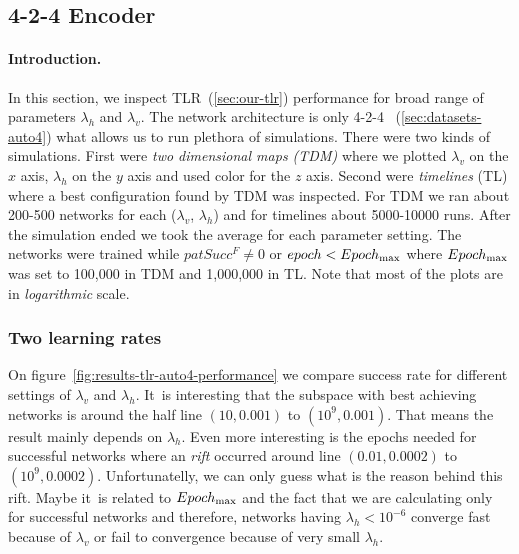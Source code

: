 

\subsection{4-2-4 Encoder} 
\label{sec:results-auto4} 

\paragraph{Introduction.} 
In this section, we inspect TLR~(\ref{sec:our-tlr}) performance for broad range of parameters $\lambda_h$ and $\lambda_v$. The network architecture is only 4-2-4~
(\ref{sec:datasets-auto4}) what allows us to run plethora of simulations. There were two kinds of simulations. First were \emph{two dimensional maps (TDM)} where we plotted $\lambda_v$ on the $x$ axis, $\lambda_h$ on the $y$ axis and used color for the $z$ axis. Second were \emph{timelines} (TL) where a best configuration found by TDM was inspected. For TDM we ran about 200-500 networks for each ($\lambda_v$, $\lambda_h$) and for timelines about 5000-10000 runs. After the simulation ended we took the average for each parameter setting. The networks were trained while $patSucc^F \neq 0$ or $epoch < Epoch_{\rm max}$ where $Epoch_{\rm max}$ was set to 100,000 in TDM and 1,000,000 in TL. Note that most of the plots are in \emph{logarithmic} scale. 

 

\subsubsection{Two learning rates} 
\label{sec:tlr-auto4}

On figure~\ref{fig:results-tlr-auto4-performance} we compare success rate for different settings of $\lambda_v$ and $\lambda_h$. It~is interesting that the subspace with best achieving networks is around the half line $(10, 0.001)$ to $(10^9, 0.001)$. That means the result mainly depends on $\lambda_h$. Even more interesting is the epochs needed for successful networks where an \emph{rift} occurred around line $(0.01, 0.0002)$ to $(10^9, 0.0002)$. Unfortunatelly, we can only guess what is the reason behind this rift. Maybe it~is related to $Epoch_{\rm max}$ and the fact that we are calculating only for successful networks and therefore, networks having $\lambda_h < 10^{-6}$ converge fast because of $\lambda_v$ or fail to convergence because of very small $\lambda_h$. 

